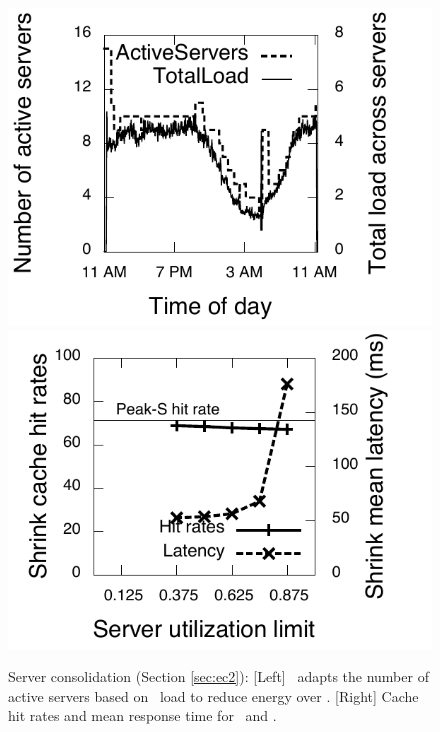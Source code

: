 \begin{figure}
\centering
\includegraphics[scale=0.4]{graphs/final/num-servers.pdf}
\includegraphics[scale=0.4]{graphs/final/hit-rate.pdf}
\caption{Server consolidation (Section \ref{sec:ec2}): [Left] \shrink\ adapts the number of active servers based on \cdc\  load to reduce energy over \peakS. [Right] Cache hit rates and mean response time for \shrink\ and \peakS.}
\label{fig:ec2-other}
\end{figure}

